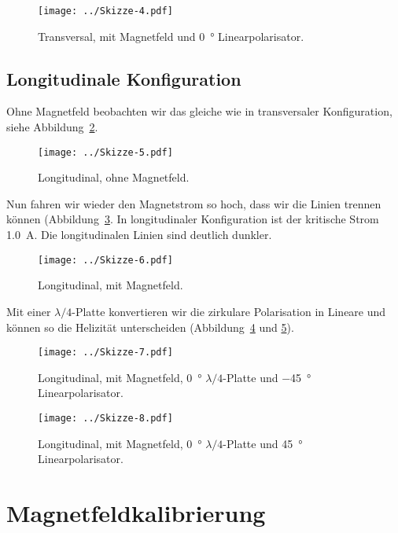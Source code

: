 \begin{figure}[htbp]
    \centering
    \texttt{[image: ../Skizze-4.pdf]}
    \caption{%
        Transversal, mit Magnetfeld und \SI{0}{\degree} Linearpolarisator.
    }
    \label{fig:Skizze-4}
\end{figure}

\subsection{Longitudinale Konfiguration}

Ohne Magnetfeld beobachten wir das gleiche wie in transversaler Konfiguration,
siehe Abbildung~\ref{fig:Skizze-5}.

\begin{figure}[htbp]
    \centering
    \texttt{[image: ../Skizze-5.pdf]}
    \caption{%
        Longitudinal, ohne Magnetfeld.
    }
    \label{fig:Skizze-5}
\end{figure}

Nun fahren wir wieder den Magnetstrom so hoch, dass wir die Linien trennen
können (Abbildung~\ref{fig:Skizze-6}. In longitudinaler Konfiguration ist der
kritische Strom \SI{1.0}{\ampere}. Die longitudinalen Linien sind deutlich
dunkler.

\begin{figure}[htbp]
    \centering
    \texttt{[image: ../Skizze-6.pdf]}
    \caption{%
        Longitudinal, mit Magnetfeld.
    }
    \label{fig:Skizze-6}
\end{figure}

Mit einer $\lambda/4$-Platte konvertieren wir die zirkulare Polarisation in
Lineare und können so die Helizität unterscheiden (Abbildung~\ref{fig:Skizze-7}
und \ref{fig:Skizze-8}).

\begin{figure}[htbp]
    \centering
    \texttt{[image: ../Skizze-7.pdf]}
    \caption{%
        Longitudinal, mit Magnetfeld, \SI{0}{\degree} $\lambda/4$-Platte und
        \SI{-45}{\degree} Linearpolarisator.
    }
    \label{fig:Skizze-7}
\end{figure}

\begin{figure}[htbp]
    \centering
    \texttt{[image: ../Skizze-8.pdf]}
    \caption{%
        Longitudinal, mit Magnetfeld, \SI{0}{\degree} $\lambda/4$-Platte und
        \SI{+45}{\degree} Linearpolarisator.
    }
    \label{fig:Skizze-8}
\end{figure}

\section{Magnetfeldkalibrierung}

